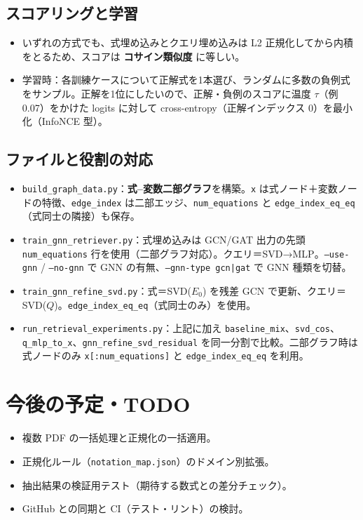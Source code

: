 \documentclass[11pt,a4paper]{jsarticle}
\begin{document}
\subsection{スコアリングと学習}
\begin{itemize}[nosep]
  \item いずれの方式でも、式埋め込みとクエリ埋め込みは L2 正規化してから内積をとるため、スコアは \textbf{コサイン類似度} に等しい。
  \item 学習時：各訓練ケースについて正解式を1本選び、ランダムに多数の負例式をサンプル。正解を1位にしたいので、正解・負例のスコアに温度 $\tau$（例 0.07）をかけた logits に対して cross-entropy（正解インデックス 0）を最小化（InfoNCE 型）。
\end{itemize}

\subsection{ファイルと役割の対応}
\begin{itemize}[nosep]
  \item \texttt{build\_graph\_data.py}：\textbf{式--変数二部グラフ}を構築。\texttt{x} は式ノード＋変数ノードの特徴、\texttt{edge\_index} は二部エッジ、\texttt{num\_equations} と \texttt{edge\_index\_eq\_eq}（式同士の隣接）も保存。
  \item \texttt{train\_gnn\_retriever.py}：式埋め込みは GCN/GAT 出力の先頭 \texttt{num\_equations} 行を使用（二部グラフ対応）。クエリ＝SVD→MLP。\texttt{--use-gnn} / \texttt{--no-gnn} で GNN の有無、\texttt{--gnn-type gcn|gat} で GNN 種類を切替。
  \item \texttt{train\_gnn\_refine\_svd.py}：式＝SVD($E_0$) を残差 GCN で更新、クエリ＝SVD($Q$)。\texttt{edge\_index\_eq\_eq}（式同士のみ）を使用。
  \item \texttt{run\_retrieval\_experiments.py}：上記に加え \texttt{baseline\_mix}、\texttt{svd\_cos}、\texttt{q\_mlp\_to\_x}、\texttt{gnn\_refine\_svd\_residual} を同一分割で比較。二部グラフ時は式ノードのみ \texttt{x[:num\_equations]} と \texttt{edge\_index\_eq\_eq} を利用。
\end{itemize}

\section{今後の予定・TODO}
\begin{itemize}[nosep]
  \item 複数 PDF の一括処理と正規化の一括適用。
  \item 正規化ルール（\texttt{notation\_map.json}）のドメイン別拡張。
  \item 抽出結果の検証用テスト（期待する数式との差分チェック）。
  \item GitHub との同期と CI（テスト・リント）の検討。
\end{itemize}
\end{document}
